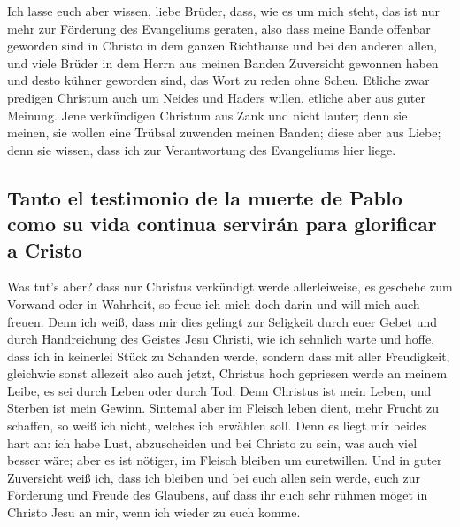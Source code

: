  Ich lasse euch aber wissen, liebe Brüder, dass, wie es
um mich steht, das ist nur mehr zur Förderung des Evangeliums geraten,
 also dass meine Bande offenbar geworden sind in Christo
in dem ganzen Richthause und bei den anderen allen,  und
viele Brüder in dem Herrn aus meinen Banden Zuversicht gewonnen haben
und desto kühner geworden sind, das Wort zu reden ohne Scheu.
 Etliche zwar predigen Christum auch um Neides und Haders
willen, etliche aber aus guter Meinung.  Jene verkündigen
Christum aus Zank und nicht lauter; denn sie meinen, sie wollen eine
Trübsal zuwenden meinen Banden;  diese aber aus Liebe;
denn sie wissen, dass ich zur Verantwortung des Evangeliums hier liege.

\hypertarget{tanto-el-testimonio-de-la-muerte-de-pablo-como-su-vida-continua-serviruxe1n-para-glorificar-a-cristo}{%
\subsection{Tanto el testimonio de la muerte de Pablo como su vida
continua servirán para glorificar a
Cristo}\label{tanto-el-testimonio-de-la-muerte-de-pablo-como-su-vida-continua-serviruxe1n-para-glorificar-a-cristo}}

 Was tut's aber? dass nur Christus verkündigt werde
allerleiweise, es geschehe zum Vorwand oder in Wahrheit, so freue ich
mich doch darin und will mich auch freuen.  Denn ich
weiß, dass mir dies gelingt zur Seligkeit durch euer Gebet und durch
Handreichung des Geistes Jesu Christi,  wie ich sehnlich
warte und hoffe, dass ich in keinerlei Stück zu Schanden werde, sondern
dass mit aller Freudigkeit, gleichwie sonst allezeit also auch jetzt,
Christus hoch gepriesen werde an meinem Leibe, es sei durch Leben oder
durch Tod.  Denn Christus ist mein Leben, und Sterben ist
mein Gewinn.  Sintemal aber im Fleisch leben dient, mehr
Frucht zu schaffen, so weiß ich nicht, welches ich erwählen soll.
 Denn es liegt mir beides hart an: ich habe Lust,
abzuscheiden und bei Christo zu sein, was auch viel besser wäre;
 aber es ist nötiger, im Fleisch bleiben um euretwillen.
 Und in guter Zuversicht weiß ich, dass ich bleiben und
bei euch allen sein werde, euch zur Förderung und Freude des Glaubens,
 auf dass ihr euch sehr rühmen möget in Christo Jesu an
mir, wenn ich wieder zu euch komme.

